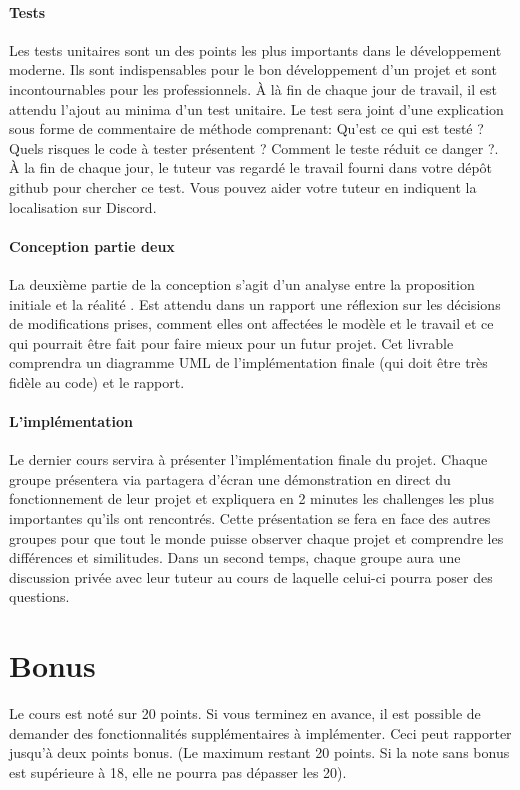 \documentclass[12pt]{article}
\begin{document}
	\paragraph{Tests}
		Les tests unitaires sont un des points les plus importants dans le développement moderne. Ils sont indispensables pour le bon développement d'un projet et sont incontournables pour les professionnels.
		À là fin de chaque jour de travail, il est attendu l'ajout au minima d'un test unitaire.
		Le test sera joint d'une explication sous forme de commentaire de méthode comprenant: Qu'est ce qui est testé ? Quels risques le code à tester présentent ? Comment le teste réduit ce danger ?.
		À la fin de chaque jour, le tuteur vas regardé le travail fourni dans votre dépôt github pour chercher ce test. Vous pouvez aider votre tuteur en indiquent la localisation sur Discord. 
		
	\paragraph{Conception partie deux }
		La deuxième partie de la conception s'agit d'un analyse entre la proposition initiale et la réalité . 
		Est attendu dans un rapport une réflexion sur les décisions de modifications prises, comment elles ont affectées le modèle et le travail et ce qui pourrait être fait pour faire mieux pour un futur projet. 
		Cet livrable comprendra un diagramme UML de l'implémentation finale (qui doit être très fidèle au code) et le rapport. 
	
	\paragraph{L'implémentation}
		Le dernier cours servira à présenter l'implémentation finale du projet. Chaque groupe présentera via partagera d'écran une démonstration en direct du fonctionnement de leur projet et expliquera en 2 minutes les challenges les plus importantes qu'ils ont rencontrés. 
		Cette présentation se fera en face des autres groupes pour que tout le monde puisse observer chaque projet et comprendre les différences et similitudes. 
		Dans un second temps, chaque groupe aura une discussion privée avec leur tuteur au cours de laquelle celui-ci pourra poser des questions.
			
	
	
	\section{Bonus}
	
	Le cours est noté sur 20 points. 
	Si vous terminez en avance, il est possible de demander des fonctionnalités supplémentaires à implémenter. Ceci peut rapporter jusqu'à deux points bonus. (Le maximum restant 20 points. Si la note sans bonus est supérieure à 18, elle ne pourra pas dépasser les 20).
	
\end{document}
